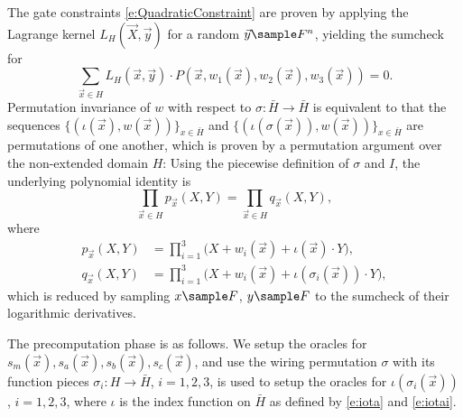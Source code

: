 \documentclass[11pt]{article}
\theoremstyle{definition}
\theoremstyle{remark}
\begin{document}
The gate constraints \eqref{e:QuadraticConstraint} are proven by applying the Lagrange kernel $L_H(\vec X,\vec y)$ for a random $\vec y\sample F^n$, yielding the sumcheck for
\[
\sum_{\vec x\in H} L_H(\vec x, \vec y) \cdot P(\vec x, w_1(\vec x), w_2(\vec x), w_3(\vec x)) = 0.
\]
Permutation invariance of $w$ with respect to $\sigma: \bar H\longrightarrow \bar H$ is equivalent to that the sequences $\{(\iota(\vec x), w(\vec x))\}_{x\in \bar H}$ and $\{(\iota(\sigma(\vec x)), w(\vec x))\}_{x\in\bar H}$
 are permutations of one another, which is proven by a permutation argument over the non-extended domain $H$: 
Using the piecewise definition of $\sigma$ and $I$, the underlying polynomial identity is
\begin{equation}
\label{e:PermutationInvarianceIdentity}
\prod_{\vec x\in H} p_{\vec x}(X, Y)= \prod_{\vec x\in H}  q_{\vec x}(X, Y),
\end{equation}
where
\begin{align}
\label{e:FactorId}
p_{\vec x}(X, Y) &= \prod_{i=1}^3 \Big(X + w_i(\vec x) +  \iota(\vec x)\cdot Y\Big),
\\
\label{e:FactorSigma}
q_{\vec x}(X,  Y) &=  \prod_{i=1}^3\Big(X + w_i(\vec x) +\iota\left(\sigma_{i}(\vec x)\right)\cdot Y\Big), 
\end{align}
which is reduced by sampling $x\sample F$, $y\sample F$ to the sumcheck of their logarithmic derivatives. 

The precomputation phase is as follows.
We setup the oracles for  $s_m(\vec x), s_a(\vec x), s_b(\vec x), s_c(\vec x)$, and use the wiring permutation $\sigma$ with its function pieces $\sigma_i: H \longrightarrow \bar H$, $i=1,2,3$, is used to setup the oracles  for $\iota(\sigma_i(\vec x))$, $i=1,2,3$, where $\iota$ is the index function on $\bar H$ as defined by \eqref{e:iota} and \eqref{e:iotai}.
\end{document}
